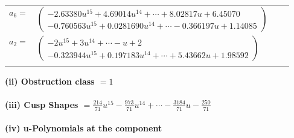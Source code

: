 \documentclass[1p]{elsarticle_modified}
\theoremstyle{definition}
\begin{document}
\begin{tabular}{m{7pt} m{180pt} m{7pt} m{180pt} }
\flushright $a_{6}=$&$\begin{pmatrix}-2.63380 u^{15}+4.69014 u^{14}+\cdots+8.02817 u+6.45070\\-0.760563 u^{15}+0.0281690 u^{14}+\cdots-0.366197 u+1.14085\end{pmatrix}$ \\
\flushright $a_{2}=$&$\begin{pmatrix}-2 u^{15}+3 u^{14}+\cdots- u+2\\-0.323944 u^{15}+0.197183 u^{14}+\cdots+5.43662 u+1.98592\end{pmatrix}$\\&\end{tabular}
\flushleft \textbf{(ii) Obstruction class $= 1$}\\~\\
\flushleft \textbf{(iii) Cusp Shapes $= \frac{214}{71} u^{15}-\frac{973}{71} u^{14}+\cdots-\frac{3184}{71} u-\frac{250}{71}$}\\~\\
\newpage\renewcommand{\arraystretch}{1}
\flushleft \textbf{(iv) u-Polynomials at the component}\newline \\
\end{document}

